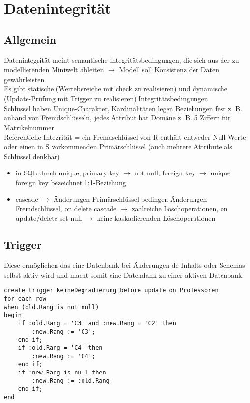 \chapter{Datenintegrität}
\section{Allgemein}
Datenintegrität meint semantische Integritätsbedingungen, die sich aus der zu modellierenden Miniwelt ableiten $\rightarrow$ Modell soll Konsistenz der Daten gewährleisten\\
Es gibt statische (Wertebereiche mit check zu realisieren) und dynamische (Update-Prüfung mit Trigger zu realisieren) Integritätsbedingungen\\
Schlüssel haben Unique-Charakter, Kardinalitäten legen Beziehungen fest z. B. anhand von Fremdschlüsseln, jedes Attribut hat Domäne z. B. 5 Ziffern für Matrikelnummer\\
Referentielle Integrität = ein Fremdschlüssel von R enthält entweder Null-Werte oder einen in S vorkommenden Primärschlüssel (auch mehrere Attribute als Schlüssel denkbar)\\
\begin{itemize}
\item in SQL durch unique, primary key $\rightarrow$ not null, foreign key $\rightarrow$ unique foreign key bezeichnet 1:1-Beziehung
\item cascade $\rightarrow$ Änderungen Primärschlüssel bedingen Änderungen Fremdschlüssel, on delete cascade $\rightarrow$ zahlreiche Löschoperationen, on update/delete set null $\rightarrow$ keine kaskadierenden Löschoperationen
\end{itemize}
\section{Trigger}
Diese ermöglichen das eine Datenbank bei Änderungen de Inhalts oder Schemas selbst aktiv wird und macht somit eine Datendank zu einer aktiven Datenbank. 
\begin{lstlisting}
create trigger keineDegradierung before update on Professoren
for each row
when (old.Rang is not null)
begin
	if :old.Rang = 'C3' and :new.Rang = 'C2' then
		:new.Rang := 'C3';
	end if;
	if :old.Rang = 'C4' then
		:new.Rang := 'C4';
	end if;
	if :new.Rang is null then
		:new.Rang := :old.Rang;
	end if;
end
\end{lstlisting}